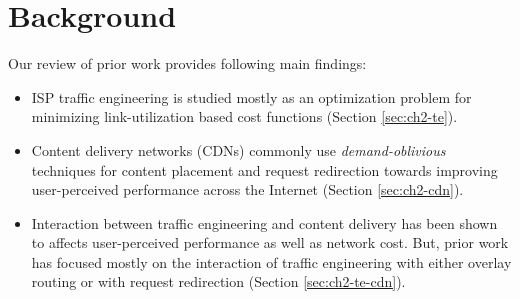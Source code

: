 

\section{Background}
\label{sec:bg-bg}
Our review of prior work provides following main findings:



\begin{itemize}
	\item
	ISP traffic engineering is studied mostly as an optimization problem for minimizing link-utilization based cost functions (Section \ref{sec:ch2-te}).
	\item
	Content delivery networks (CDNs) commonly use \emph{demand-oblivious} techniques for content placement and request redirection towards improving user-perceived performance across the Internet (Section \ref{sec:ch2-cdn}).
	\item
	Interaction between traffic engineering and content delivery has been shown to affects user-perceived performance as well as network cost. But, prior work has focused mostly on the interaction of traffic engineering with either overlay routing or with request redirection (Section \ref{sec:ch2-te-cdn}).
\end{itemize}


